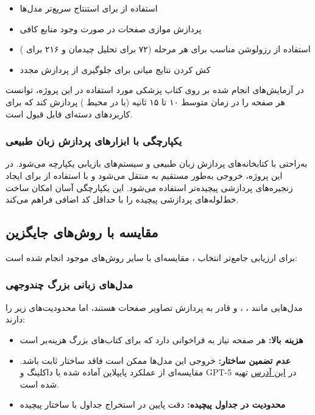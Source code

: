 \begin{itemize}
    \item استفاده از  برای استنتاج سریع‌تر مدل‌ها
    \item پردازش موازی صفحات در صورت وجود منابع کافی
    \item استفاده از رزولوشن مناسب برای هر مرحله (۷۲  برای تحلیل چیدمان و ۲۱۶  برای )
    \item کش کردن نتایج میانی برای جلوگیری از پردازش مجدد
\end{itemize}

\noindent
در آزمایش‌های انجام شده بر روی کتاب پزشکی مورد استفاده در این پروژه،  توانست هر صفحه را در زمان متوسط ۱۰ تا ۱۵ ثانیه (با  در محیط ) پردازش کند که برای کاربردهای دسته‌ای قابل قبول است.

\subsubsection{یکپارچگی با ابزارهای پردازش زبان طبیعی}
 به‌راحتی با کتابخانه‌های پردازش زبان طبیعی و سیستم‌های بازیابی یکپارچه می‌شود. در این پروژه، خروجی  به‌طور مستقیم به  منتقل می‌شود و با استفاده از  برای ایجاد زنجیره‌های پردازشی پیچیده‌تر استفاده می‌شود. این یکپارچگی آسان امکان ساخت خط‌لوله‌های پردازشی پیچیده را با حداقل کد اضافی فراهم می‌کند.

\subsection{مقایسه با روش‌های جایگزین}
برای ارزیابی جامع‌تر انتخاب ، مقایسه‌ای با سایر روش‌های موجود انجام شده است:

\subsubsection{مدل‌های زبانی بزرگ چندوجهی }
مدل‌هایی مانند ، ، و  قادر به پردازش تصاویر صفحات هستند، اما محدودیت‌های زیر را دارند:

\begin{itemize}
    \item \textbf{هزینه بالا:} هر صفحه نیاز به فراخوانی  دارد که برای کتاب‌های بزرگ هزینه‌بر است
    \item \textbf{عدم تضمین ساختار:} خروجی این مدل‌ها ممکن است فاقد ساختار ثابت باشد. مقایسه‌ای از عملکرد پایپلاین آماده شده با داکلینگ و GPT-5 در \href{https://github.com/Alijanloo/MultiModalRag/tree/master/docs/compare\%20docling\%20with\%20GPT-5}{این آدرس} تهیه شده است.
    \item \textbf{محدودیت در جداول پیچیده:} دقت پایین در استخراج جداول با ساختار پیچیده
\end{itemize}


